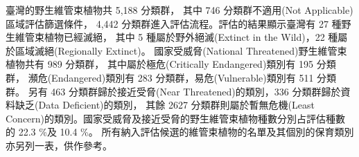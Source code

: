 
\indent 臺灣的野生維管束植物共 5,188 分類群，
其中 746 分類群不適用(Not Applicable)區域評估篩選條件，
4,442 分類群進入評估流程。評估的結果顯示臺灣有 27 種野生維管束植物已經滅絕，
其中 5 種屬於野外絕滅(Extinct in the Wild)，22 種屬於區域滅絕(Regionally Extinct)。
國家受威脅(National Threatened)野生維管束植物共有 989 分類群，
其中屬於極危(Critically Endangered)類別有 195 分類群，
瀕危(Endangered)類別有 283 分類群，易危(Vulnerable)類別有 511 分類群。
另有 463 分類群歸於接近受脅(Near Threatened)的類別，336 分類群歸於資料缺乏(Data Deficient)的類別，
其餘 2627 分類群則屬於暫無危機(Least Concern)的類別。國家受威脅及接近受脅的野生維管束植物種數分別占評估種數的 22.3 \%及 10.4 \%。
所有納入評估候選的維管束植物的名單及其個別的保育類別亦另列一表，供作參考。\\
